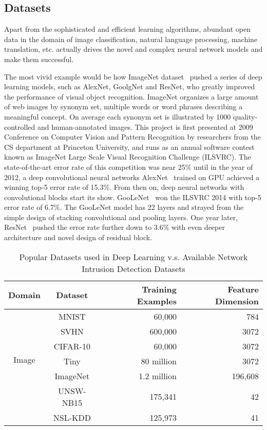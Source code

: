 \subsection{Datasets}
Apart from the sophisticated and efficient learning algorithms,
abundant open data in the domain of image classification, natural language processing, machine translation, etc.
actually drives the novel and complex neural network models and make them successful.

The most vivid example would be how ImageNet dataset~\cite{ImageNet} pushed a series of deep learning models,
such as AlexNet, GoolgNet and ResNet, who greatly improved the performance of visual object recognition.
ImageNet organizes a large amount of web images by synonym set, multiple words or word phrases
describing a meaningful concept.
On average each synonym set is illustrated by 1000 quality-controlled and human-annotated images.
This project is first presented at 2009 Conference on Computer Vision and Pattern Recognition by researchers
from the CS department at Princeton University, and runs as an annual software contest known as
ImageNet Large Scale Visual Recognition Challenge (ILSVRC).
The state-of-the-art error rate of this competition was near 25\% until in the year of 2012,
a deep convolutional neural networks AlexNet~\cite{AlexNet} trained on GPU achieved a winning top-5 error rate of 15.3\%.
From then on, deep neural networks with convolutional blocks start its show.
GooLeNet~\cite{GoogLeNet} won the ILSVRC 2014 with top-5 error rate of 6.7\%.
The GooLeNet model has 22 layers and strayed from the simple design of stacking convolutional and pooling layers.
One year later, ResNet~\cite{ResNet} pushed the error rate further down to 3.6\% with even deeper architecture and novel design of residual block.

\begin{table}[]
\centering
\caption{Popular Datasets used in Deep Learning v.s. Available Network Intrusion Detection Datasets}
\label{Tab:Datasets}
\begin{tabular}{c|c|r|r}
\multicolumn{1}{c|}{Domain}                          & Dataset       & Training Examples & Feature Dimension \\
\hline
\hline
\multirow{6}{*}{Image}                               & MNIST         & 60,000        & 784     \\
                                                     & SVHN          & 600,000       & 3072    \\
                                                     & CIFAR-10      & 60,000        & 3072    \\
                                                     & Tiny          & 80 million    & 3072    \\
                                                     & ImageNet      & 1.2 million   & 196,608 \\
\hline
\multicolumn{1}{c|}{\multirow{2}{*}{IDS}}            & UNSW-NB15     & 175,341       & 42      \\
\multicolumn{1}{l|}{}                                & NSL-KDD       & 125,973       & 41      
\end{tabular}
\end{table}

